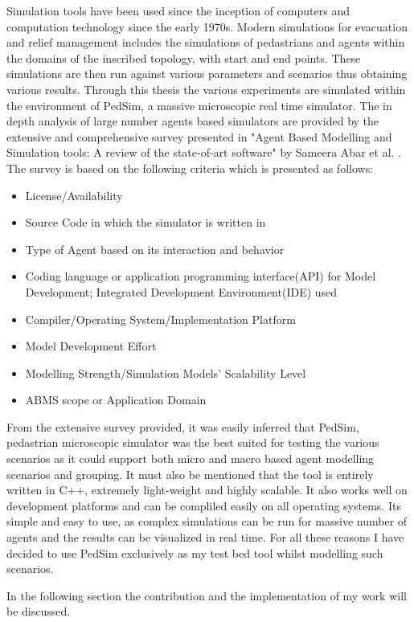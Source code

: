 Simulation tools have been used since the inception of computers and computation technology since the early 1970s. Modern simulations for evacuation and relief management includes the simulations of pedastrians and agents within the domains of the inscribed topology, with start and end points. These simulations are then run against various parameters and scenarios thus obtaining various results. Through this thesis the various experiments are simulated within the environment of PedSim, a massive microscopic real time simulator. The in depth analysis of large number agents based simulators are provided by the extensive and comprehensive survey presented in "Agent Based Modelling and Simulation tools: A review of the state-of-art software" by Sameera Abar et al. \cite{ref22}. The survey is based on the following criteria which is presented as follows:

\begin{itemize}
  \item License/Availability
  \item Source Code in which the simulator is written in
  \item Type of Agent based on its interaction and behavior
  \item Coding language or application programming interface(API) for Model Development; Integrated Development Environment(IDE) used
  \item Compiler/Operating System/Implementation Platform
  \item Model Development Effort
  \item Modelling Strength/Simulation Models' Scalability Level
  \item ABMS scope or Application Domain
\end{itemize} 

From the extensive survey provided, it was easily inferred that PedSim, pedastrian microscopic simulator was the best suited for testing the various scenarios as it could support both micro and macro based agent modelling scenarios and grouping. It must also be mentioned that the tool is entirely written in C++, extremely light-weight and highly scalable. It also works well on development platforms and can be compliled easily on all operating systems. Its simple and easy to use, as complex simulations can be run for massive number of agents and the results can be visualized in real time. For all these reasons I have decided to use PedSim exclusively as my test bed tool whilst modelling such scenarios. 

In the following section the contribution and the implementation of my work will be discussed.

